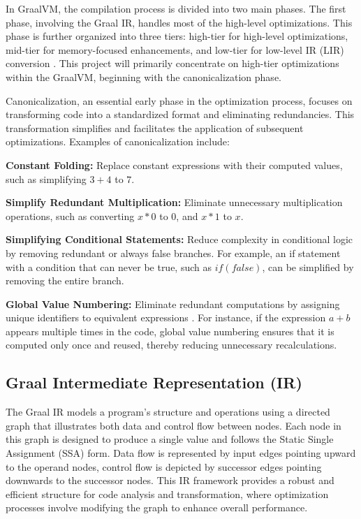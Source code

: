 In GraalVM, the compilation process is divided into two main phases. The first phase, involving the Graal IR, handles most of the high-level optimizations. This phase is further organized into three tiers: high-tier for high-level optimizations, mid-tier for memory-focused enhancements, and low-tier for low-level IR (LIR) conversion \cite{Graal2021}. This project will primarily concentrate on high-tier optimizations within the GraalVM, beginning with the canonicalization phase.

Canonicalization, an essential early phase in the optimization process, focuses on transforming code into a standardized format and eliminating redundancies. This transformation simplifies and facilitates the application of subsequent optimizations. Examples of canonicalization include:

\begin{description}
    \item \textbf{Constant Folding:} Replace constant expressions with their computed values, such as simplifying \newline
    \(3 + 4\) to \(7\).
    \item \textbf{Simplify Redundant Multiplication:} Eliminate unnecessary multiplication operations, such as converting \(x * 0\) to 0, and \(x * 1\) to \(x\).
    \item \textbf{Simplifying Conditional Statements:} Reduce complexity in conditional logic by removing redundant or always false branches. For example, an if statement with a condition that can never be true, such as \(if (false)\), can be simplified by removing the entire branch.
    \item \textbf{Global Value Numbering:} Eliminate redundant computations by assigning unique identifiers to equivalent expressions \cite{Cliff1995}. For instance, if the expression \(a + b\) appears multiple times in the code, global value numbering ensures that it is computed only once and reused, thereby reducing unnecessary recalculations.
\end{description}

\subsection{Graal Intermediate Representation (IR)}

The Graal IR \cite{Duboscq2013} models a program's structure and operations using a directed graph that illustrates both data and control flow between nodes. Each node in this graph is designed to produce a single value and follows the Static Single Assignment (SSA) \cite{Ron1991} form. Data flow is represented by input edges pointing upward to the operand nodes, control flow is depicted by successor edges pointing downwards to the successor nodes. This IR framework provides a robust and efficient structure for code analysis and transformation, where optimization processes involve modifying the graph to enhance overall performance.

